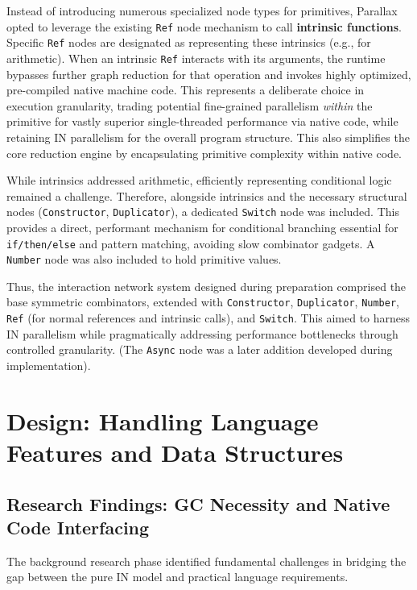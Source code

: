 Instead of introducing numerous specialized node types for primitives, Parallax opted to leverage the existing \texttt{Ref} node mechanism to call \textbf{intrinsic functions}. Specific \texttt{Ref} nodes are designated as representing these intrinsics (e.g., for arithmetic). When an intrinsic \texttt{Ref} interacts with its arguments, the runtime bypasses further graph reduction for that operation and invokes highly optimized, pre-compiled native machine code. This represents a deliberate choice in execution granularity, trading potential fine-grained parallelism \textit{within} the primitive for vastly superior single-threaded performance via native code, while retaining IN parallelism for the overall program structure. This also simplifies the core reduction engine by encapsulating primitive complexity within native code.

While intrinsics addressed arithmetic, efficiently representing conditional logic remained a challenge. Therefore, alongside intrinsics and the necessary structural nodes (\texttt{Constructor}, \texttt{Duplicator}), a dedicated \texttt{Switch} node was included. This provides a direct, performant mechanism for conditional branching essential for \texttt{if/then/else} and pattern matching, avoiding slow combinator gadgets. A \texttt{Number} node was also included to hold primitive values.

Thus, the interaction network system designed during preparation comprised the base symmetric combinators, extended with \texttt{Constructor}, \texttt{Duplicator}, \texttt{Number}, \texttt{Ref} (for normal references and intrinsic calls), and \texttt{Switch}. This aimed to harness IN parallelism while pragmatically addressing performance bottlenecks through controlled granularity. (The \texttt{Async} node was a later addition developed during implementation).

\section{Design: Handling Language Features and Data Structures}\label{sec:prep_design_features}

\subsection{Research Findings: GC Necessity and Native Code Interfacing}
The background research phase identified fundamental challenges in bridging the gap between the pure IN model and practical language requirements.

